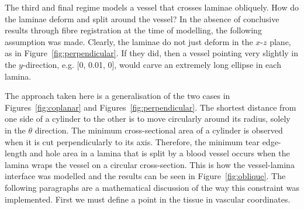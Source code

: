   The third and final regime models a vessel that crosses laminae obliquely. How do the laminae deform and split around the vessel? In the absence of conclusive results through fibre registration at the time of modelling, the following assumption was made. Clearly, the laminae do not just deform in the $x$-$z$ plane, as in Figure~\ref{fig:perpendicular}. If they did, then a vessel pointing very slightly in the $y$-direction, e.g. [0, 0.01, 0], would carve an extremely long ellipse in each lamina.
  
  The approach taken here is a generalisation of the two cases in Figures~\ref{fig:coplanar} and Figures~\ref{fig:perpendicular}. The shortest distance from one side of a cylinder to the other is to move circularly around its radius, solely in the $\theta$ direction. The minimum cross-sectional area of a cylinder is observed when it is cut perpendicularly to its axis. Therefore, the minimum tear edge-length and hole area in a lamina that is split by a blood vessel occurs when the lamina wraps the vessel on a circular cross-section. This is how the vessel-lamina interface was modelled and the results can be seen in Figure~\ref{fig:oblique}. The following paragraphs are a mathematical discussion of the way this constraint was implemented. First we must define a point in the tissue in vascular coordinates.
  
